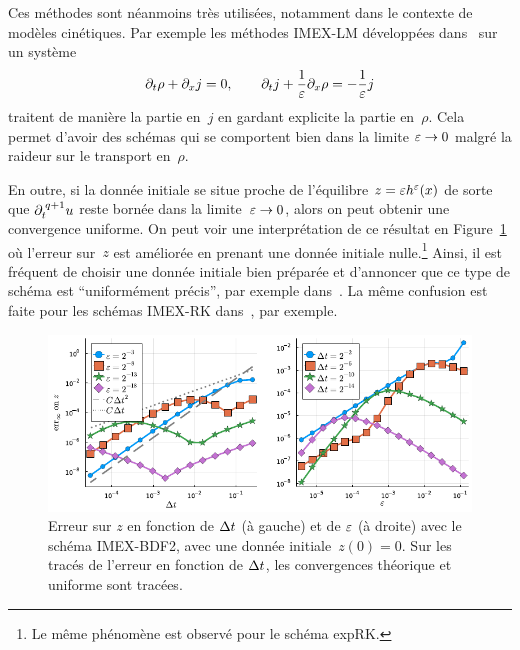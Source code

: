 Ces méthodes sont néanmoins très utilisées, notamment dans le contexte de modèles cinétiques. Par exemple les méthodes IMEX-LM développées dans~\cite{lemou.2008.new,boscarino.2017.unified,albi.2020.implicit} sur un système 
\begin{equation*}
    \partial_t \rho + \partial_x j = 0, \qquad 
    \partial_t j + \frac{1}{\varepsilon} \partial_x \rho = -\frac{1}{\varepsilon}j 
\end{equation*}
traitent de manière la partie en~$j$ en gardant explicite la partie en~$\rho$. Cela permet d'avoir des schémas qui se comportent bien dans la limite $\varepsilon \rightarrow 0$ malgré la raideur sur le transport en~$\rho$. 

En outre, si la donnée initiale se situe proche de l'équilibre $z = \varepsilon h^{\varepsilon}(x)$ de sorte que $\partial_t^{\: q+1} u$ reste bornée dans la limite~$\varepsilon \rightarrow 0$, alors on peut obtenir une convergence uniforme. On peut voir une interprétation de ce résultat en Figure~\ref{sec:intro:fig:bdf2_z0} où l'erreur sur~$z$ est améliorée en prenant une donnée initiale nulle.\footnote{Le même phénomène est observé pour le schéma expRK.} Ainsi, il est fréquent de choisir une donnée initiale bien préparée et d'annoncer que ce type de schéma est \enquote{uniformément précis}, par exemple dans~\cite{jin.2000.uniformly,hu.2021.uniform}. La même confusion est faite pour les schémas IMEX-RK dans~\cite{boscarino.2009.class,boscarino.2017.unified}, par exemple. 

\begin{figure}[!h]
    \centering
    \includegraphics[width=\textwidth]{./Presentation/bdf2_err_z0.pdf}
    \caption{Erreur sur $z$ en fonction de $\Delta t$ (à gauche) et de $\varepsilon$ (à droite) avec le schéma IMEX-BDF2, avec une donnée initiale~$z(0) = 0$. Sur les tracés de l'erreur en fonction de $\Delta t$, les convergences théorique et uniforme sont tracées.}
    \label{sec:intro:fig:bdf2_z0}
\end{figure}



